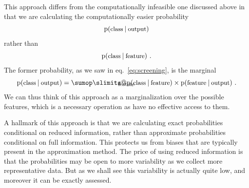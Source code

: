 \documentclass[\ifafour a4paper,12pt,\else a5paper,10pt,\fi%
onecolumn,oneside,article,%
british%
]{memoir}
\makeatletter
\theoremstyle{remark}
\theoremstyle{innote}
\def\sum{\DOTSI\sumop\slimits@}
\newcommand*{\p}{\mathrm{p}}%
\renewcommand*{\|}[1][]{\nonscript\:#1\vert\nonscript\:\mathopen{}}
\newcommand*{\eqn}{eq.}%
\newcommand*{\texts}[1]{\text{\small #1}}
\makeatother
\begin{document}

This approach differs from the computationally infeasible one discussed above in that we are calculating the computationally easier probability
\begin{equation}
  \label{eq:approach_p_test}
  \p(\texts{class} \| \texts{output})
\end{equation}
rather than
\begin{equation}
  \label{eq:approach_p_feature}
  \p(\texts{class} \| \texts{feature}) \ .
\end{equation}
The former probability, as we saw in \eqn~\eqref{eq:screening}, is the marginal
\begin{equation}
  \label{eq:approach_p_marginal}
  \p(\texts{class} \| \texts{output}) =
  \sum_{\text{\clap{feature}}}
  \p(\texts{class} \| \texts{feature})\times
  \p(\texts{feature} \| \texts{output}) \ .
\end{equation}
We can thus think of this approach as a marginalization over the possible features, which is a necessary operation as have no effective access to them.

A hallmark of this approach is that we are calculating exact probabilities conditional on reduced information, rather than approximate probabilities conditional on full information. This protects us from biases that are typically present in the approximation method. The price of using reduced information is that the probabilities may be open to more variability as we collect more representative data. But as we shall see this variability is actually quite low, and moreover it can be exactly assessed.
\end{document}
